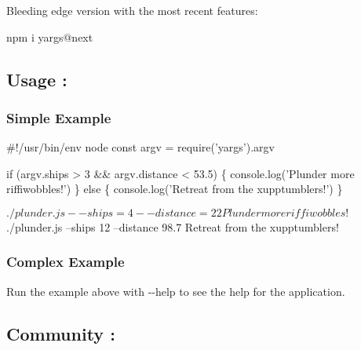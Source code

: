Bleeding edge version with the most recent features\+: 
\begin{DoxyCode}
npm i yargs@next
\end{DoxyCode}


\subsection*{Usage \+:}

\subsubsection*{Simple Example}


\begin{DoxyCode}
#!/usr/bin/env node
const argv = require('yargs').argv

if (argv.ships > 3 && argv.distance < 53.5) \{
  console.log('Plunder more riffiwobbles!')
\} else \{
  console.log('Retreat from the xupptumblers!')
\}
\end{DoxyCode}



\begin{DoxyCode}
$ ./plunder.js --ships=4 --distance=22
Plunder more riffiwobbles!

$ ./plunder.js --ships 12 --distance 98.7
Retreat from the xupptumblers!
\end{DoxyCode}


\subsubsection*{Complex Example}




Run the example above with {\ttfamily -\/-\/help} to see the help for the application.

\subsection*{Community \+:}

